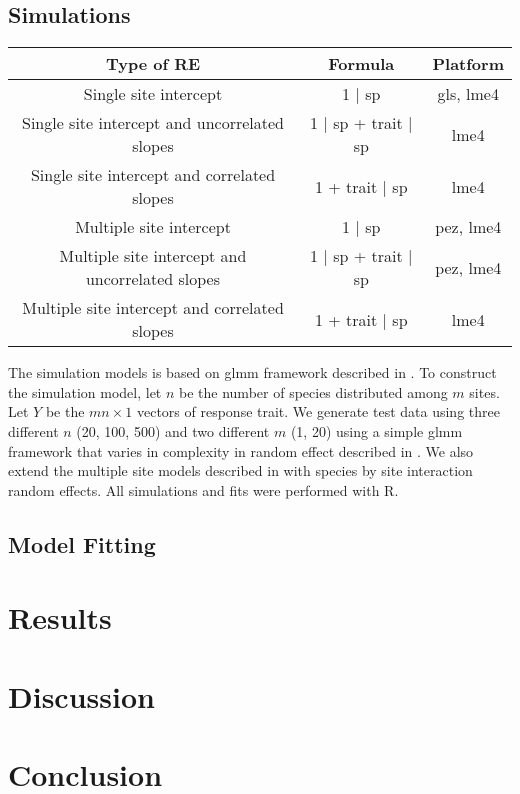 \documentclass[12pt]{article}
\begin{document}
\subsection{Simulations}

\begin{tabular}{|c|c|c|}
\hline
Type of RE	& Formula	& Platform	\\
\hline

Single site intercept	  &	1 $\mid$ sp	& gls, lme4 \\
Single site intercept and uncorrelated slopes		&  1 $\mid$ sp + trait $\mid$ sp		& lme4 \\
Single site intercept and correlated slopes 			& 1 + trait $\mid$ sp					& lme4 \\
\hline
Multiple site intercept 									&  1 $\mid$ sp 						& pez, lme4 \\
Multiple site intercept and uncorrelated slopes 	&  1 $\mid$ sp + trait $\mid$ sp 		& pez, lme4 \\
Multiple site intercept and correlated slopes 	& 	1 + trait $\mid$ sp					& lme4 \\
\hline
\end{tabular}

The simulation models is based on glmm framework described in .   
To construct the simulation model, let $n$ be the number of species distributed among $m$ sites.
Let $Y$ be the $mn \times 1$ vectors of response trait.  
We generate test data using three different $n$ (20, 100, 500) and two different $m$ (1, 20) using a simple glmm framework that varies in complexity in random effect described in . 
We also extend the multiple site models described in  with species by site interaction random effects. 
All simulations and fits were performed with R. 

\subsection{Model Fitting}



\section{Results}



\section{Discussion}

\section{Conclusion}
\end{document}
